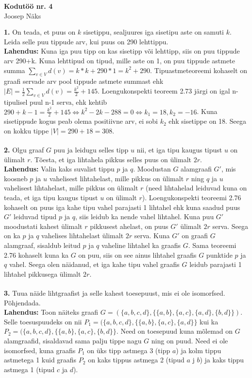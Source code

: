 \documentclass{article}
\begin{document}
\begin{center}
\Large\textbf{Kodut\"o\"o nr. 4}\\
Joosep N\"aks
\end{center}
\textbf{1.} On teada, et puus on $k$ sisetippu, sealjuures iga sisetipu aste on samuti $k$. Leida selle puu tippude arv, kui puus on 290 lehttippu.\\
\textbf{Lahendus:} Kuna iga puu tipp on kas sisetipp või lehttipp, siis on puu tippude arv 290+k. Kuna lehttipud on tipud, mille aste on 1, on puu tippude astmete summa $\displaystyle\sum_{v\in V} d(v) = k*k+290*1=k^2+290$. Tipuastmeteoreemi kohaselt on graafi servade arv pool tippude astmete summast ehk $|E|=\displaystyle\frac{1}{2}\sum_{v\in V} d(v)=\frac{k^2}{2}+145$. Loengukonspekti teoreem 2.73 j\"argi on igal n-tipulisel puul n-1 serva, ehk kehtib $290+k-1=\frac{k^2}{2}+145 \Leftrightarrow k^2-2k-288=0 \Leftrightarrow k_1=18, k_2=-16$. Kuna sisetippude kogus peab olema positiivne arv, ei sobi $k_2$ ehk sisetippe on 18. Seega on kokku tippe $|V|=290+18=308$.\\\\
\textbf{2.} Olgu graaf $G$ puu ja leidugu selles tipp $u$ nii, et iga tipu kaugus tipust $u$ on \"ulimalt $r$. T\~oesta, et iga lihtahela pikkus selles puus on \"ulimalt $2r$.\\
\textbf{Lahendus:} Valin kaks suvalist tippu $p$ ja $q$. Moodustan $G$ alamgraafi $G'$, mis koosneb $p$ ja $u$ vahelisest lihtahelast, mille pikkus on \"ulimalt $r$ ning $q$ ja $u$ vahelisest lihtahelast, mille pikkus on \"ulimalt $r$ (need lihtahelad leiduvad kuna on teada, et iga tipu kaugus tipust $u$ on \"ulimalt $r$). Loengukonspekti teoreemi 2.76 kohaselt on puus iga kahe tipu vahel parajasti 1 lihtahel ehk kuna saadud puus $G'$ leiduvad tipud $p$ ja $q$, siis leidub ka nende vahel lihtahel. Kuna puu $G'$ moodustati kahest \"ulimalt $r$ pikkusest ahelast, on puus $G'$ \"ulimalt $2r$ serva. Seega on ka $p$ ja $q$ vahelises lihtahelast \"ulimalt $2r$ serva. Kuna $G'$ on graafi $G$ alamgraaf, sisaldub leitud $p$ ja $q$ vaheline lihtahel ka graafis $G$. Sama teoreemi 2.76 kohaselt kuna ka $G$ on puu, siis on see ainus lihtahel graafis $G$ punktide $p$ ja $q$ vahel. Seega olen n\"aidanud, et iga kahe tipu vahel graafis $G$ leidub parajasti 1 lihtahel pikkusega \"ulimalt $2r$.\\\\
\textbf{3.} Tuua n\"aide lihtgraafist ja selle kahest toesepuust, mis ei ole isomorfsed. P\~ohjendada.\\
\textbf{Lahendus:} Toon n\"aiteks graafi $G=(\{a,b,c,d\},\{\{a,b\},\{a,c\},\{a,d\},\{b,d\}\})$. Selle toesuspuudeks on nii $P_1=(\{a,b,c,d\},\{\{a,b\},\{a,c\},\{a,d\}\}$ kui ka $P_2=(\{a,b,c,d\},\{\{a,b\},\{a,c\},\{b,d\}\}$. Need on toesepuud kuna m\~olemad on $G$ alamgraafid, sisaldavad sama palju tippe nagu $G$ ning on puud. Need ei ole isomorfsed, kuna graafis $P_1$ on \"uks tipp astmega 3 (tipp $a$) ja kolm tippu astmetega 1 kuid graafis $P_2$ on kaks tippus astmega 2 (tipud $a$ j $b$) ja kaks tippu astmega 1 (tipud $c$ ja $d$).\\\\
\end{document}
